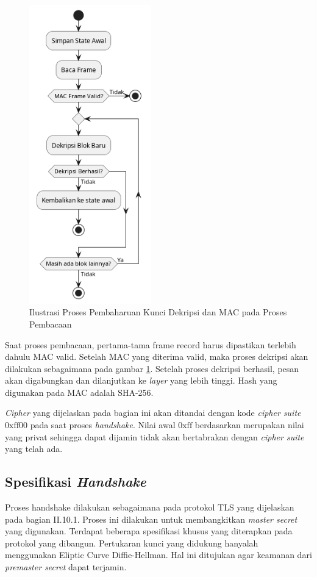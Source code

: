 \begin{figure}[!h]
  \centering
  \includegraphics[width=200px]{chapters/res/chapter-3/img/update.read.png}
  \caption{Ilustrasi Proses Pembaharuan Kunci Dekripsi dan MAC pada Proses Pembacaan} \label{fig:tls.cipher.update.mac.read}
\end{figure}

Saat proses pembacaan, pertama-tama frame record harus dipastikan terlebih dahulu MAC valid. Setelah MAC yang diterima valid, maka proses dekripsi akan dilakukan sebagaimana pada gambar \ref{fig:tls.cipher.update.mac.read}. Setelah proses dekripsi berhasil, pesan akan digabungkan dan dilanjutkan ke \emph{layer} yang lebih tinggi. Hash yang digunakan pada MAC adalah SHA-256.

\emph{Cipher} yang dijelaskan pada bagian ini akan ditandai dengan kode \emph{cipher suite} $\text{0xff00}$ pada saat proses \emph{handshake}. Nilai awal $\text{0xff}$ berdasarkan \textcite{rfc5246} merupakan nilai yang privat sehingga dapat dijamin tidak akan bertabrakan dengan \emph{cipher suite} yang telah ada.

\subsection{Spesifikasi \emph{Handshake}}

Proses handshake dilakukan sebagaimana pada protokol TLS yang dijelaskan pada bagian II.10.1. Proses ini dilakukan untuk membangkitkan \emph{master secret} yang digunakan. Terdapat beberapa spesifikasi khusus yang diterapkan pada protokol yang dibangun. Pertukaran kunci yang didukung hanyalah menggunakan Eliptic Curve Diffie-Hellman. Hal ini ditujukan agar keamanan dari \emph{premaster secret} dapat terjamin.

